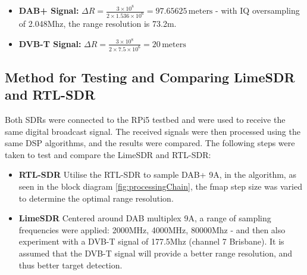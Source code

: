 \begin{itemize}
    \item \textbf{DAB+ Signal:} \( \Delta R = \frac{3 \times 10^8}{2 \times 1.536 \times 10^6} = 97.65625 \, \text{meters}\) - with IQ oversampling of 2.048Mhz, the range resolution is 73.2m.
    \item \textbf{DVB-T Signal:} \( \Delta R = \frac{3 \times 10^8}{2 \times 7.5 \times 10^6} = 20 \, \text{meters}\)
\end{itemize}

\subsection{Method for Testing and Comparing LimeSDR and RTL-SDR}
Both SDRs were connected to the RPi5 testbed and were used to receive the same digital broadcast signal. The received signals were then processed using the same DSP algorithms, and the results were compared. The following steps were taken to test and compare the LimeSDR and RTL-SDR:

\begin{itemize} 
    \item \textbf{RTL-SDR} Utilise the RTL-SDR to sample DAB+ 9A, in the algorithm, as seen in the block diagram \ref{fig:processingChain}, the fmap step size was varied to determine the optimal range resolution.
    \item \textbf{LimeSDR} Centered around DAB multiplex 9A, a range of sampling frequencies were applied: 2000MHz, 4000MHz, 80000Mhz - and then also experiment with a DVB-T signal of 177.5Mhz (channel 7 Brisbane). It is assumed that the DVB-T signal will provide a better range resolution, and thus better target detection.
\end{itemize}



